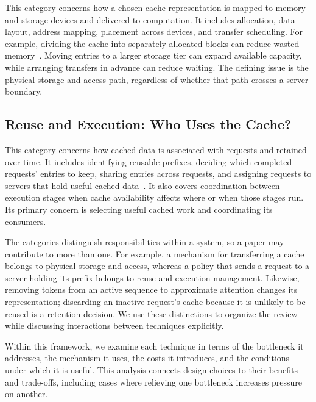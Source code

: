 This category concerns how a chosen cache representation is mapped to memory and storage devices and delivered to computation. It includes allocation, data layout, address mapping, placement across devices, and transfer scheduling. For example, dividing the cache into separately allocated blocks can reduce wasted memory~\cite{kv_kwon2023pagedattention}. Moving entries to a larger storage tier can expand available capacity, while arranging transfers in advance can reduce waiting. The defining issue is the physical storage and access path, regardless of whether that path crosses a server boundary.

\subsection{Reuse and Execution: Who Uses the Cache?}

This category concerns how cached data is associated with requests and retained over time. It includes identifying reusable prefixes, deciding which completed requests' entries to keep, sharing entries across requests, and assigning requests to servers that hold useful cached data~\cite{kv_zheng2024sglang,kv_qin2025mooncake}. It also covers coordination between execution stages when cache availability affects where or when those stages run. Its primary concern is selecting useful cached work and coordinating its consumers.

The categories distinguish responsibilities within a system, so a paper may contribute to more than one. For example, a mechanism for transferring a cache belongs to physical storage and access, whereas a policy that sends a request to a server holding its prefix belongs to reuse and execution management. Likewise, removing tokens from an active sequence to approximate attention changes its representation; discarding an inactive request's cache because it is unlikely to be reused is a retention decision. We use these distinctions to organize the review while discussing interactions between techniques explicitly.

Within this framework, we examine each technique in terms of the bottleneck it addresses, the mechanism it uses, the costs it introduces, and the conditions under which it is useful. This analysis connects design choices to their benefits and trade-offs, including cases where relieving one bottleneck increases pressure on another.
